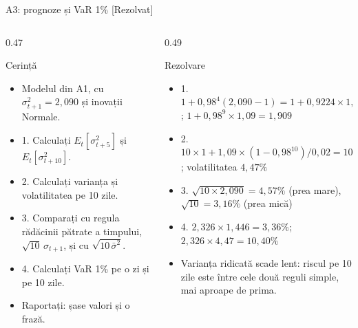 \begin{frame}{A3: prognoze și VaR 1\% [Rezolvat]}
\itemsize{\scriptsize}
\begin{columns}[T]
\begin{column}{0.47\textwidth}
\begin{block}{Cerință}
\begin{itemize}
    \item Modelul din A1, cu $\sigma_{t+1}^2 = 2{,}090$ și inovații Normale.
    \item 1. Calculați $E_t[\sigma_{t+5}^2]$ și $E_t[\sigma_{t+10}^2]$.
    \item 2. Calculați varianța și volatilitatea pe 10 zile.
    \item 3. Comparați cu regula rădăcinii pătrate a timpului, $\sqrt{10}\,\sigma_{t+1}$, și cu $\sqrt{10\,\bar\sigma^2}$.
    \item 4. Calculați VaR 1\% pe o zi și pe 10 zile.
    \item Raportați: șase valori și o frază.
\end{itemize}
\end{block}
\end{column}
\begin{column}{0.49\textwidth}
\begin{exampleblock}{Rezolvare}
\begin{itemize}
    \item 1. $1 + 0{,}98^{4}(2{,}090 - 1) = 1 + 0{,}9224 \times 1{,}09 = 2{,}005$; $1 + 0{,}98^{9} \times 1{,}09 = 1{,}909$
    \item 2. $10 \times 1 + 1{,}09 \times (1 - 0{,}98^{10})/0{,}02 = 10 + 1{,}09 \times 9{,}146 = 19{,}97$; volatilitatea $4{,}47\%$
    \item 3. $\sqrt{10 \times 2{,}090} = 4{,}57\%$ (prea mare), $\sqrt{10} = 3{,}16\%$ (prea mică)
    \item 4. $2{,}326 \times 1{,}446 = 3{,}36\%$; $2{,}326 \times 4{,}47 = 10{,}40\%$
    \item Varianța ridicată scade lent: riscul pe 10 zile este între cele două reguli simple, mai aproape de prima.
\end{itemize}
\end{exampleblock}
\end{column}
\end{columns}
\end{frame}

